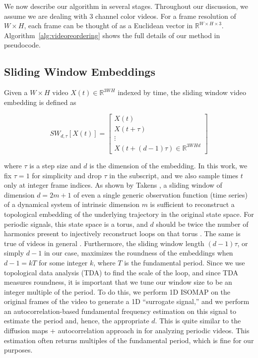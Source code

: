 \documentclass{article}
\begin{document}
We now describe our algorithm in several stages.  Throughout our discussion, we assume we are dealing with 3 channel color videos.  For a frame resolution of $W \times H$, each frame can be thought of as a Euclidean vector in $\mathbb{R}^{W \times H \times 3}$.  Algorithm~\ref{alg:videoreordering} shows the full details of our method in pseudocode.

\subsection{Sliding Window Embeddings}
\label{sec:slidingwindow}

Given a $W \times H$ video $X(t) \in \mathbb{R}^{3WH}$ indexed by time, the sliding window video embedding \cite{cao1998dynamics,traliehigh,tralie2017quasi} is defined as

\begin{equation}
SW_{d, \tau}[X(t)] = \left[ \begin{array}{c} X(t) \\ X(t + \tau) \\ \vdots \\ X(t + (d-1)\tau)  \in \mathbb{R}^{3WHd} \end{array} \right]
\end{equation}

where $\tau$ is a step size and $d$ is the dimension of the embedding.  In this work, we fix $\tau = 1$ for simplicity and drop $\tau$ in the subscript, and we also sample times $t$ only at integer frame indices.  As shown by Takens \cite{takens1981detecting}, a sliding window of dimension $d = 2m+1$ of even a single generic observation function (time series) of a dynamical system of intrinsic dimension $m$ is sufficient to reconstruct a topological embedding of the underlying trajectory in the original state space.  For periodic signals, this state space is a torus, and $d$ should be twice the number of harmonics present to injectively reconstruct loops on that torus \cite{perea2015sliding}.  The same is true of videos in general \cite{tralie2017quasi}.  Furthermore, the sliding window length $(d-1) \tau$, or simply $d-1$ in our case, maximizes the roundness of the embeddings when $d-1 = k T$ for some integer $k$, where $T$ is the fundamental period.  Since we use topological data analysis (TDA) to find the scale of the loop, and since TDA measures roundness, it is important that we tune our window size to be an integer multiple of the period.  To do this, we perform 1D ISOMAP \cite{tenenbaum2000global} on the original frames of the video to generate a 1D ``surrogate signal,'' and we perform an autocorrelation-based fundamental frequency estimation \cite{Mcleod05asmarter} on this signal to estimate the period and, hence, the appropriate $d$.  This is quite similar to the diffusion maps + autocorrelation approach in \cite{tralie2017quasi} for analyzing periodic videos.  This estimation often returns multiples of the fundamental period, which is fine for our purposes.
\end{document}
